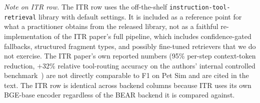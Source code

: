 \begin{table}[t]
  \footnotesize\raggedright
  \textit{Note on ITR row.} The ITR row uses the off-the-shelf
  \texttt{instruction-tool-retrieval} library with default settings.
  It is included as a reference point for what a practitioner obtains
  from the released library, not as a faithful re-implementation of
  the ITR paper's full pipeline, which includes confidence-gated
  fallbacks, structured fragment types, and possibly fine-tuned
  retrievers that we do not exercise. The ITR paper's own reported
  numbers (95\% per-step context-token reduction, $+$32\% relative
  tool-routing accuracy on the authors' internal controlled
  benchmark~\citep{franko2025itr}) are not directly comparable to F1
  on Pet Sim and are cited in the text. The ITR row is identical
  across backend columns because ITR uses its own BGE-base encoder
  regardless of the BEAR backend it is compared against.
\end{table}

